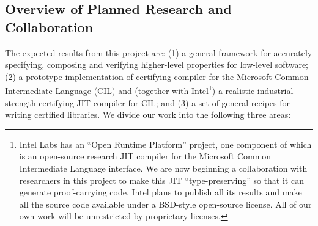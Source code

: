 \subsection{Overview of Planned Research and Collaboration}
\label{ssec:sow}

The expected results from this project are: 
(1) a general framework for accurately specifying, composing and 
    verifying higher-level properties for low-level software; 
(2) a prototype implementation of certifying compiler for the Microsoft Common
Intermediate Language (CIL) and
    (together with Intel\footnote{
Intel Labs has an ``Open Runtime Platform'' project, one component
of which is
an open-source research JIT compiler for the Microsoft Common Intermediate
Language
interface.  We are now beginning a collaboration with
researchers in this project to make this JIT ``type-preserving'' so
that it can generate proof-carrying code.  Intel plans to publish
all its results and make all the source code available
under a BSD-style open-source license.  
All of our own work will be unrestricted
by proprietary licenses.}) 
a realistic industrial-strength 
    certifying JIT compiler for CIL; and
(3) a set of general recipes for writing certified libraries.
We divide our work into the following three areas:
%
